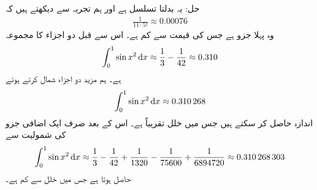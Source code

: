 حل:\quad
یہ بدلتا تسلسل ہے اور ہم تجربہ سے دیکھتے ہیں کہ
  \begin{align*}
\frac{1}{11\cdot5!}\approx \num{0.00076}
\end{align*}
وہ پہلا جزو ہے جس کی قیمت  سے کم ہے۔ اس سے قبل دو اجزاء کا مجموعہ
\begin{align*}
\int_0^1\sin x^2\dif x\approx \frac{1}{3}-\frac{1}{42}\approx 0.310
\end{align*}
ہے۔ ہم مزید دو اجزاء شمال کرتے ہوئے
\begin{align*}
\int_0^1\sin x^2\dif x\approx \num{0.310268}
\end{align*}
اندازہ حاصل کر سکتے ہیں جس میں خلل تقریباً   ہے۔ اس کے بعد صرف ایک اضافی جزو کی شمولیت سے
\begin{align*}
\int_0^1\sin x^2\dif x\approx \frac{1}{3}-\frac{1}{42}+\frac{1}{1320}-\frac{1}{75600}+\frac{1}{6894720}\approx \num{0.310268303}
\end{align*}
حاصل ہوتا ہے جس میں خلل  سے کم ہے۔ 

